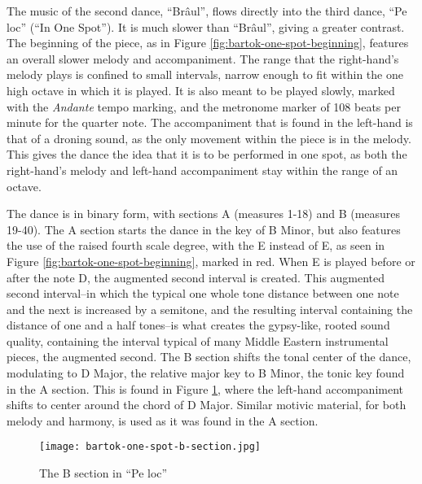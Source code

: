 The music of the second dance, ``Brâul'', flows directly into the third dance, ``Pe loc'' (``In One Spot''). It is much slower than ``Brâul'', giving a greater contrast. The beginning of the piece, as in Figure \ref{fig:bartok-one-spot-beginning}\autocite{Lung_2016}, features an overall slower melody and accompaniment. The range that the right-hand's melody plays is confined to small intervals, narrow enough to fit within the one high octave in which it is played. It is also meant to be played slowly, marked with the \textit{Andante} tempo marking, and the metronome marker of 108 beats per minute for the quarter note. The accompaniment that is found in the left-hand is that of a droning sound, as the only movement within the piece is in the melody. This gives the dance the idea that it is to be performed in one spot, as both the right-hand's melody and left-hand accompaniment stay within the range of an octave.

The dance is in binary form, with sections A (measures 1-18) and B (measures 19-40). The A section starts the dance in the key of B Minor, but also features the use of the raised fourth scale degree, with the E\musSharp{} instead of E, as seen in Figure \ref{fig:bartok-one-spot-beginning}\autocite{Lung_2016}, marked in red. When E\musSharp{} is played before or after the note D, the augmented second interval is created. This augmented second interval--in which the typical one whole tone distance between one note and the next is increased by a semitone, and the resulting interval containing the distance of one and a half tones--is what creates the gypsy-like, rooted sound quality, containing the interval typical of many Middle Eastern instrumental pieces, the augmented second. The B section shifts the tonal center of the dance, modulating to D Major, the relative major key to B Minor, the tonic key found in the A section. This is found in Figure \ref{fig:bartok-one-spot-b-section}\autocite{Lung_2016}, where the left-hand accompaniment shifts to center around the chord of D Major. Similar motivic material, for both melody and harmony, is used as it was found in the A section.

\begin{figure}[h]
  \centering
  \texttt{[image: bartok-one-spot-b-section.jpg]}
  \caption[The B section of ``Pe loc'', of Bartok's \textit{Romanian Folk Dances, Sz. 56, BB 68}]{The B section in ``Pe loc''}
  \label{fig:bartok-one-spot-b-section}
\end{figure}

